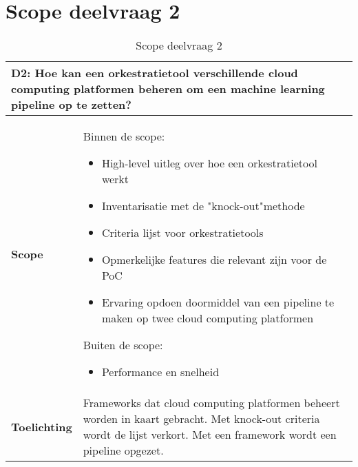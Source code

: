 \section{Scope deelvraag 2}\label{appendix:scope-subquestion-2}
\begin{table}[hbt!]
  \centering
  \caption{Scope deelvraag 2}
  \vspace*{.5\baselineskip}
  \begin{tabular}{|p{.215\linewidth}|p{.72\linewidth}|}
  \hline
  \multicolumn{2}{|p{.97\linewidth}|}{\textbf{D2: Hoe kan een orkestratietool verschillende cloud computing platformen beheren om een machine learning pipeline op te zetten?}} \\ \hline
    \textbf{Scope}&
      Binnen de scope:
      \begin{itemize}
        \item High-level uitleg over hoe een orkestratietool werkt
        \item Inventarisatie met de "knock-out"\space methode
        \item Criteria lijst voor orkestratietools
        \item Opmerkelijke features die relevant zijn voor de PoC
        \item Ervaring opdoen doormiddel van een pipeline te maken op twee cloud computing platformen
      \end{itemize}
      Buiten de scope:
      \begin{itemize}
        \item Performance en snelheid
      \end{itemize}
    \\ \hline
    \textbf{Toelichting}&
      Frameworks dat cloud computing platformen beheert worden in kaart gebracht. Met knock-out criteria wordt de lijst verkort. Met een framework wordt een pipeline opgezet.
    \\ \hline
  \end{tabular}
  \label{table:scope-subquestion-2}
  \end{table}

